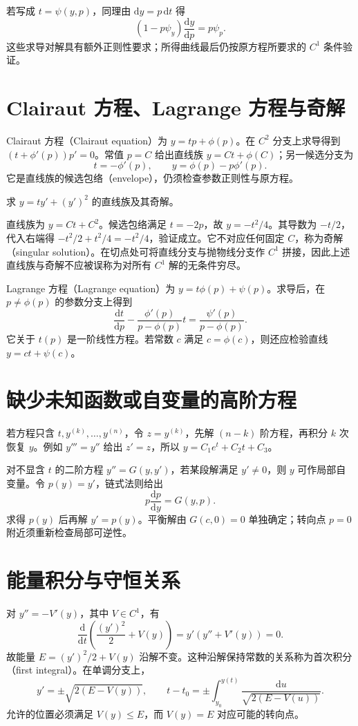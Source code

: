 \documentclass[UTF8,12pt,a4paper,fontset=fandol]{ctexbook}
\begin{document}
若写成 $t=\psi(y,p)$，同理由 $\mathrm dy=p\,\mathrm dt$ 得
\[
 (1-p\psi_y)\frac{\mathrm dy}{\mathrm dp}=p\psi_p.
\]
这些求导对解具有额外正则性要求；所得曲线最后仍按原方程所要求的 $C^1$ 条件验证。

\section{Clairaut 方程、Lagrange 方程与奇解}
Clairaut 方程（Clairaut equation）为 $y=tp+\phi(p)$。在 $C^2$ 分支上求导得到 $(t+\phi'(p))p'=0$。常值 $p=C$ 给出直线族 $y=Ct+\phi(C)$；另一候选分支为
\[
 t=-\phi'(p),\qquad y=\phi(p)-p\phi'(p).
\]
它是直线族的候选包络（envelope），仍须检查参数正则性与原方程。

\begin{example}[奇解]
求 $y=ty'+(y')^2$ 的直线族及其奇解。
\end{example}
\begin{solve}
直线族为 $y=Ct+C^2$。候选包络满足 $t=-2p$，故 $y=-t^2/4$。其导数为 $-t/2$，代入右端得 $-t^2/2+t^2/4=-t^2/4$，验证成立。它不对应任何固定 $C$，称为奇解（singular solution）。在切点处可将直线分支与抛物线分支作 $C^1$ 拼接，因此上述直线族与奇解不应被误称为对所有 $C^1$ 解的无条件穷尽。
\end{solve}

Lagrange 方程（Lagrange equation）为 $y=t\phi(p)+\psi(p)$。求导后，在 $p\ne\phi(p)$ 的参数分支上得到
\[
 \frac{\mathrm dt}{\mathrm dp}-\frac{\phi'(p)}{p-\phi(p)}t
 =\frac{\psi'(p)}{p-\phi(p)}.
\]
它关于 $t(p)$ 是一阶线性方程。若常数 $c$ 满足 $c=\phi(c)$，则还应检验直线 $y=ct+\psi(c)$。

\section{缺少未知函数或自变量的高阶方程}
若方程只含 $t,y^{(k)},\ldots,y^{(n)}$，令 $z=y^{(k)}$，先解 $(n-k)$ 阶方程，再积分 $k$ 次恢复 $y$。例如 $y'''=y''$ 给出 $z'=z$，所以 $y=C_1e^t+C_2t+C_3$。

对不显含 $t$ 的二阶方程 $y''=G(y,y')$，若某段解满足 $y'\ne0$，则 $y$ 可作局部自变量。令 $p(y)=y'$，链式法则给出
\[
 p\frac{\mathrm dp}{\mathrm dy}=G(y,p).
\]
求得 $p(y)$ 后再解 $y'=p(y)$。平衡解由 $G(c,0)=0$ 单独确定；转向点 $p=0$ 附近须重新检查局部可逆性。

\section{能量积分与守恒关系}
对 $y''=-V'(y)$，其中 $V\in C^1$，有
\begin{equation}
 \frac{\mathrm d}{\mathrm dt}\left(\frac{(y')^2}{2}+V(y)\right)
 =y'(y''+V'(y))=0.
 \label{eq:ode-energy}
\end{equation}
故能量 $E=(y')^2/2+V(y)$ 沿解不变。这种沿解保持常数的关系称为首次积分（first integral）。在单调分支上，
\[
 y'=\pm\sqrt{2(E-V(y))},\qquad
 t-t_0=\pm\int_{y_0}^{y(t)}\frac{\mathrm du}{\sqrt{2(E-V(u))}}.
\]
允许的位置必须满足 $V(y)\leq E$，而 $V(y)=E$ 对应可能的转向点。
\end{document}
